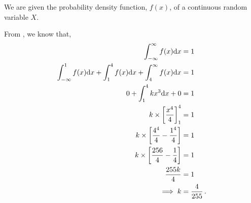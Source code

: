 %
%


\begin{subquestions}
	
\subquestion

We are given the probability density function, $f(x)$, of a continuous random variable $X$.

From , we know that,
\begin{align}
	\int_{-\infty}^{\infty} f(x)\mathrm{d}x & = 1 \nonumber \\
	\int_{-\infty}^{1} f(x)\mathrm{d}x + \int_{1}^{4} f(x)\mathrm{d}x + \int_{4}^{\infty} f(x)\mathrm{d}x & = 1 \nonumber \\
	0 + \int_{1}^{4} kx^3\mathrm{d}x + 0  & = 1 \nonumber \\
	k \times \left[\frac{x^4}{4}\right]^4_1 & = 1 \nonumber \\
	k \times \left[\frac{4^4}{4} - \frac{1^4}{4} \right] & = 1 \nonumber \\
	k \times \left[\frac{256}{4} - \frac{1}{4} \right] & = 1 \nonumber \\
	\frac{255k}{4} & = 1 \nonumber \\
	\implies k & = \frac{4}{255} \,.
\end{align}


\subquestion

\begin{subsubquestions}
	
\subsubquestion


\end{subsubquestions}
\end{subquestions}
